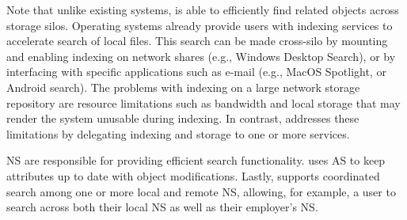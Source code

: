 
Note that unlike existing systems, \emph{\system} is able to efficiently find related
objects across storage silos. Operating systems already provide users with
indexing services to accelerate search of local files. This search can be made
cross-silo by mounting and enabling indexing on network shares (e.g., Windows
Desktop Search), or by interfacing with specific applications such as e-mail
(e.g., MacOS Spotlight, or Android search). The problems with indexing on a
large network storage repository are resource limitations such as bandwidth and
local storage that may render the system unusable during indexing. In contrast,
\emph{\system} addresses these limitations by delegating indexing and storage to one or
more services.

NS are responsible for providing efficient search functionality. \emph{\system} uses AS
to keep attributes up to date with object modifications. Lastly, \emph{\system}
supports coordinated search among one or more local and remote NS, allowing, for
example, a user to search across both their local NS as well as their employer's
NS.

